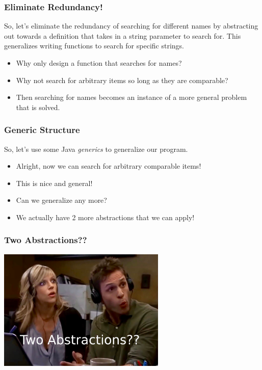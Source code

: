 \documentclass{beamer}
\begin{document}
\begin{frame}
  \frametitle{Eliminate Redundancy!}
  So, let's eliminate the redundancy of searching
  for different names by abstracting out towards
  a definition that takes in a string parameter
  to search for. This generalizes writing functions
  to search for specific strings.

  \abstractOne
  \begin{itemize}
  \item<2-> Why only design a function that searches for names?
  \item<3-> Why not search for arbitrary items so long as they
    are comparable?
  \item<4-> Then searching for names becomes an instance of a
    more general problem that is solved.    
  \end{itemize}
\end{frame}


\begin{frame}
  \frametitle{Generic Structure}
  So, let's use some Java \emph{generics} to generalize our program.
  \abstractTwo
  \begin{itemize}
  \item<2-> Alright, now we can search for arbitrary comparable items!
  \item<3-> This is nice and general!
  \item<4-> Can we generalize any more?
  \item<5-> We actually have 2 more abstractions that we can apply!
  \end{itemize}
\end{frame}

\begin{frame}
  \frametitle{Two Abstractions??}
  \centering \includegraphics[width=0.6\textwidth]{images/two-abstractions.jpg}
\end{frame}
\end{document}
